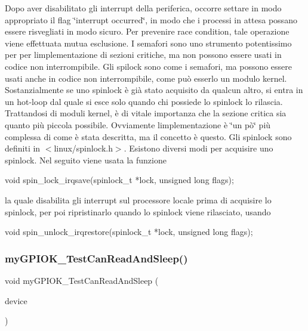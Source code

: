 Dopo aver disabilitato gli interrupt della periferica, occorre settare in modo appropriato il flag \char`\"{}interrupt occurred\char`\"{}, in modo che i processi in attesa possano essere risvegliati in modo sicuro. Per prevenire race condition, tale operazione viene effettuata mutua esclusione. I semafori sono uno strumento potentissimo per per l\textquotesingle{}implementazione di sezioni critiche, ma non possono essere usati in codice non interrompibile. Gli spilock sono come i semafori, ma possono essere usati anche in codice non interrompibile, come può esserlo un modulo kernel. Sostanzialmente se uno spinlock è già stato acquisito da qualcun altro, si entra in un hot-\/loop dal quale si esce solo quando chi possiede lo spinlock lo rilascia. Trattandosi di moduli kernel, è di vitale importanza che la sezione critica sia quanto più piccola possibile. Ovviamente l\textquotesingle{}implementazione è \char`\"{}un pò\char`\"{} più complessa di come è stata descritta, ma il concetto è questo. Gli spinlock sono definiti in $<$linux/spinlock.\+h$>$. Esistono diversi modi per acquisire uno spinlock. Nel seguito viene usata la funzione 
\begin{DoxyCode}
\textcolor{keywordtype}{void} spin\_lock\_irqsave(spinlock\_t *lock, \textcolor{keywordtype}{unsigned} \textcolor{keywordtype}{long} flags);
\end{DoxyCode}
 la quale disabilita gli interrupt sul processore locale prima di acquisire lo spinlock, per poi ripristinarlo quando lo spinlock viene rilasciato, usando 
\begin{DoxyCode}
\textcolor{keywordtype}{void} spin\_unlock\_irqrestore(spinlock\_t *lock, \textcolor{keywordtype}{unsigned} \textcolor{keywordtype}{long} flags);
\end{DoxyCode}
 \mbox{\label{group___linux-_driver_gaf1b6f35c097c46361d675a42f122828e}} 
\subsubsection{\texorpdfstring{my\+G\+P\+I\+O\+K\+\_\+\+Test\+Can\+Read\+And\+Sleep()}{myGPIOK\_TestCanReadAndSleep()}}
{\footnotesize\ttfamily void my\+G\+P\+I\+O\+K\+\_\+\+Test\+Can\+Read\+And\+Sleep (\begin{DoxyParamCaption}\item[{\hyperlink{structmy_g_p_i_o_k__t}{my\+G\+P\+I\+O\+K\+\_\+t} $\ast$}]{device }\end{DoxyParamCaption})}



